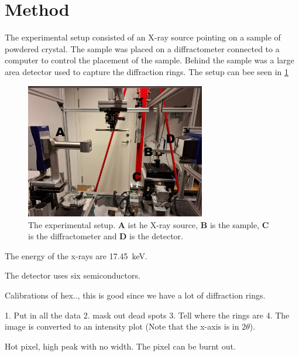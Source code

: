 \section{Method}
The experimental setup consisted of an X-ray source pointing on a sample of powdered crystal. The sample was placed on a diffractometer connected to a computer to control the placement of the sample. Behind the sample was a large area detector used to capture the diffraction rings. The setup can bee seen in \ref{fig:setup}
\begin{figure}[H]
    \centering
    \includegraphics[width=0.7\textwidth]{Figures/setup_letters.jpg}
    \caption{The experimental setup. \textbf{A} ist he X-ray source, \textbf{B} is the sample, \textbf{C} is the diffractometer and \textbf{D} is the detector.}
    \label{fig:setup}
\end{figure}


The energy of the x-rays are \SI{17.45}{\kilo\electronvolt}. 

The detector uses six semiconductors. 

Calibrations of hex.., this is good since we have a lot of diffraction rings.  

1. Put in all the data
2. mask out dead spots
3. Tell where the rings are 
4. The image is converted to an intensity plot (Note that the x-axis is in $2\theta$). 


Hot pixel, high peak with no width. The pixel can be burnt out. 

